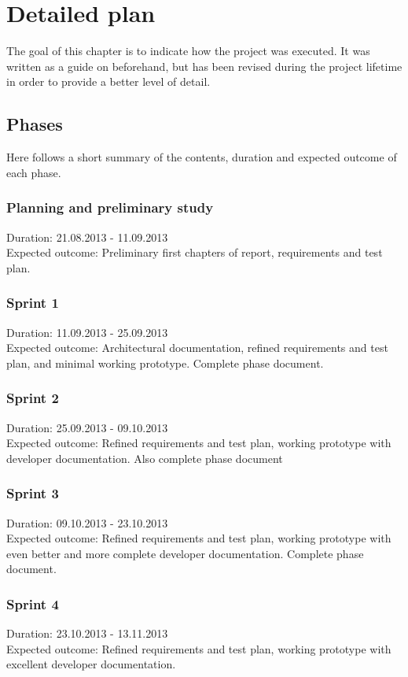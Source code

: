 \documentclass[11pt]{book}
\begin{document}
\section{Detailed plan}
The goal of this chapter is to indicate how the project was executed. It was written as a guide on beforehand, but has been revised during the project lifetime in order to provide a better level of detail.

\subsection{Phases}
Here follows a short summary of the contents, duration and expected outcome of each phase.

\subsubsection{Planning and preliminary study}
Duration: 21.08.2013 - 11.09.2013\\
Expected outcome: Preliminary first chapters of report, requirements and test plan.

\subsubsection{Sprint 1}
Duration: 11.09.2013 - 25.09.2013\\
Expected outcome: Architectural documentation, refined requirements and test plan, and minimal working prototype. Complete phase document.

\subsubsection{Sprint 2}
Duration: 25.09.2013 - 09.10.2013\\
Expected outcome: Refined requirements and test plan, working prototype with developer documentation. Also complete phase document

\subsubsection{Sprint 3}
Duration: 09.10.2013 - 23.10.2013\\
Expected outcome: Refined requirements and test plan, working prototype with even better and more complete developer documentation. Complete phase document.

\subsubsection{Sprint 4}
Duration: 23.10.2013 - 13.11.2013\\
Expected outcome: Refined requirements and test plan, working prototype with excellent developer documentation.
\end{document}
